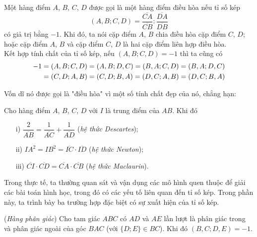     \begin{definition}
        Một hàng điểm \(A\), \(B\), \(C\), \(D\) được gọi là một hàng điểm điều hòa nếu tỉ số kép \[(A,B;C,D) = \frac{\overline{CA}}{\overline{CB}} : \frac{\overline{DA}}{\overline{DB}}\] có giả trị bằng \(-1\). Khi đó, ta nói cặp điểm \(A\), \(B\) chia điều hòa cặp điểm \(C\), \(D\); hoặc cặp điểm \(A\), \(B\) và cặp điểm \(C\), \(D\) là hai cặp điểm liên hợp điều hòa.\\
        Kết hợp tính chất của tỉ số kép, nếu \((A,B;C,D) = -1\) thì ta cũng có
        \begin{equation}
            \begin{aligned}
                -1 & = (A,B;C,D) = (A,B;D,C) = (B,A;C,D) = (B,A;D,C)\\
                & = (C,D;A,B) = (C,D;B,A) = (D,C;A,B) = (D,C;B,A)
            \end{aligned}
            \notag
        \end{equation}
    \end{definition}

    Vốn dĩ nó được gọi là "điều hòa" vì một số tính chất đẹp của nó, chẳng hạn:

    \begin{theorem}
        Cho hàng điểm \(A\), \(B\), \(C\), \(D\) với \(I\) là trung điểm của \(AB\). Khi đó
        \begin{enumerate}
            \item[i)] \(\dfrac{2}{\overline{AB}} = \dfrac{1}{\overline{AC}} + \dfrac{1}{\overline{AD}}\) (\textit{hệ thức Descartes});
            \item[ii)] \(IA^2 = IB^2 = \overline{IC} \cdot \overline{ID}\) (\textit{hệ thức Newton});
            \item[iii)] \(\overline{CI} \cdot \overline{CD} = \overline{CA} \cdot \overline{CB}\) (\textit{hệ thức Maclaurin}).
        \end{enumerate}
    \end{theorem}

    Trong thực tế, ta thường quan sát và vận dụng các mô hình quen thuộc để giải các bài toán hình học, trong đó có các yếu tố liên quan đến tỉ số kép. Trong phần này, ta trình bày ba trường hợp đặc biệt có sự xuất hiện của tỉ số kép.

    \begin{property}
        (\textit{Hàng phân giác}) Cho tam giác \(ABC\) có \(AD\) và \(AE\) lần lượt là phân giác trong và phân giác ngoài của góc \(BAC\) (với \(\{D;E\} \in BC\)). Khi đó \((B,C;D,E) = -1\).
    \end{property}

